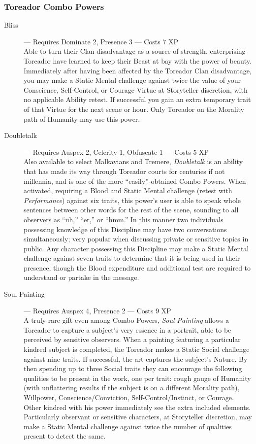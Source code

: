 \subsubsection{Toreador Combo Powers}
\begin{description}
	\item[Bliss]--- Requires Dominate 2, Presence 3 --- Costs 7 XP \\
	Able to turn their Clan disadvantage as a source of strength, enterprising Toreador have 
	learned to keep their Beast at bay with the power of beauty.  Immediately after having 
	been affected by the Toreador Clan disadvantage, you may make a Static Mental challenge 
	against twice the value of your Conscience, Self-Control, or Courage Virtue at Storyteller 
	discretion, with no applicable Ability retest.  If successful you gain an extra temporary 
	trait of that Virtue for the next scene or hour.  Only Toreador on the Morality path of 
	Humanity may use this power.
	\item[Doubletalk]--- Requires Auspex 2, Celerity 1, Obfuscate 1 --- Costs 5 XP \\
	Also available to select Malkavians and Tremere, \emph{Doubletalk} is an ability that 
	has made its way through Toreador courts for centuries if not millennia, and is one of the more 
	``easily''-obtained Combo Powers.  When activated,  requiring a Blood and Static Mental challenge 
	(retest with \emph{Performance}) against six traits, this power's user is able to speak whole 
	sentences between other words for the rest of the scene, sounding to all observers as ``uh,'' 
	``er,'' or ``hmm.''  In this manner two individuals possessing knowledge of this Discipline may 
	have two conversations simultaneously; very popular when discussing private or sensitive topics in 
	public.  Any character possessing this Discipline may make a Static Mental challenge against seven 
	traits to determine that it is being used in their presence, though the Blood expenditure and 
	additional test are required to understand or partake in the message.
	\item[Soul Painting]--- Requires Auspex 4, Presence 2 --- Costs 9 XP \\
	A truly rare gift even among Combo Powers, \emph{Soul Painting} allows a Toreador 
	to capture a subject's very essence in a portrait, able to be perceived by sensitive 
	observers.  When a painting featuring a particular kindred subject is completed, the Toreador 
	makes a Static Social challenge against nine traits.  If successful, the art captures the 
	subject's Nature.  By then spending up to three Social traits they can encourage the following 
	qualities to be present in the work, one per trait:  rough gauge of Humanity (with unflattering 
	results if the subject is on a different Morality path), Willpower, Conscience/Conviction, 
	Self-Control/Instinct, or Courage.  Other kindred with his power immediately see the extra 
	included elements.  Particularly observant or sensitive characters, at Storyteller discretion, 
	may make a Static Mental challenge against twice the number of qualities present to detect 
	the same.
\end{description}

